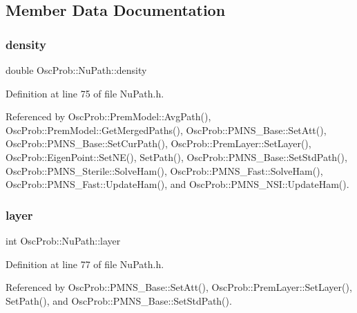 \subsection{Member Data Documentation}
\mbox{\label{structOscProb_1_1NuPath_a54ddd451db69bc54434de3cf18a117ca}} 
\subsubsection{\texorpdfstring{density}{density}}
{\footnotesize\ttfamily double Osc\+Prob\+::\+Nu\+Path\+::density}



Definition at line 75 of file Nu\+Path.\+h.



Referenced by Osc\+Prob\+::\+Prem\+Model\+::\+Avg\+Path(), Osc\+Prob\+::\+Prem\+Model\+::\+Get\+Merged\+Paths(), Osc\+Prob\+::\+P\+M\+N\+S\+\_\+\+Base\+::\+Set\+Att(), Osc\+Prob\+::\+P\+M\+N\+S\+\_\+\+Base\+::\+Set\+Cur\+Path(), Osc\+Prob\+::\+Prem\+Layer\+::\+Set\+Layer(), Osc\+Prob\+::\+Eigen\+Point\+::\+Set\+N\+E(), Set\+Path(), Osc\+Prob\+::\+P\+M\+N\+S\+\_\+\+Base\+::\+Set\+Std\+Path(), Osc\+Prob\+::\+P\+M\+N\+S\+\_\+\+Sterile\+::\+Solve\+Ham(), Osc\+Prob\+::\+P\+M\+N\+S\+\_\+\+Fast\+::\+Solve\+Ham(), Osc\+Prob\+::\+P\+M\+N\+S\+\_\+\+Fast\+::\+Update\+Ham(), and Osc\+Prob\+::\+P\+M\+N\+S\+\_\+\+N\+S\+I\+::\+Update\+Ham().

\mbox{\label{structOscProb_1_1NuPath_a442b160899e554ad1d800989510d5309}} 
\subsubsection{\texorpdfstring{layer}{layer}}
{\footnotesize\ttfamily int Osc\+Prob\+::\+Nu\+Path\+::layer}



Definition at line 77 of file Nu\+Path.\+h.



Referenced by Osc\+Prob\+::\+P\+M\+N\+S\+\_\+\+Base\+::\+Set\+Att(), Osc\+Prob\+::\+Prem\+Layer\+::\+Set\+Layer(), Set\+Path(), and Osc\+Prob\+::\+P\+M\+N\+S\+\_\+\+Base\+::\+Set\+Std\+Path().

